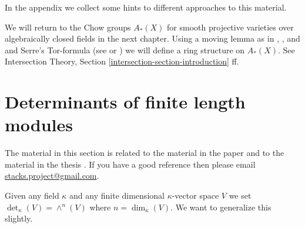 \medskip\noindent
In the appendix we collect some hints to different approaches to this material.

\medskip\noindent
We will return to the Chow groups $A_*(X)$ for smooth projective varieties
over algebraically closed fields in the next chapter. Using a moving
lemma as in \cite{Samuel}, \cite{ChevalleyI}, and \cite{ChevalleyII}
and Serre's Tor-formula
(see \cite{Serre_local_algebra} or \cite{Serre_algebre_locale})
we will define a ring structure on $A_*(X)$. See
Intersection Theory, Section \ref{intersection-section-introduction} ff.



\section{Determinants of finite length modules}
\label{section-determinants-finite-length}

\noindent
The material in this section is related to the material in
the paper \cite{determinant} and to the material in the
thesis \cite{Joe}. If you have a good reference then please
email \href{mailto:stacks.project@gmail.com}{stacks.project@gmail.com}.

\medskip\noindent
Given any field $\kappa$ and
any finite dimensional $\kappa$-vector space $V$ we set
$\det\nolimits_\kappa(V) = \wedge^n(V)$
where $n = \dim_\kappa(V)$. We want to generalize this slightly.

